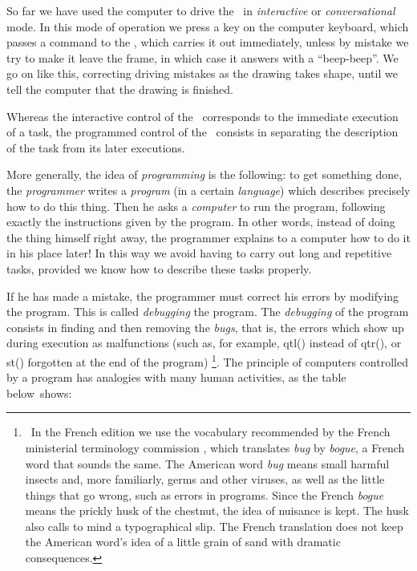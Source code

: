 
So far we have used the computer to
drive the \robot\ in {\em interactive} or
{\em conversational} mode. In this mode of operation
we press a key on the computer keyboard, which passes
a command to the \robot, which carries it out immediately, unless by mistake
we try to make it leave the frame, in which case it answers with
a ``beep-beep''.
We go on like this, correcting driving mistakes as
the drawing takes shape, until we
tell the computer that the drawing is finished.

\smallskip

Whereas the interactive control of the \robot\ corresponds to the immediate
execution of a task, the programmed control of the \robot\ consists
in separating the description of the task from its later executions.

\smallskip

More
generally, the idea of {\em programming} is the following:
to get something done, the {\em programmer} writes a {\em program}
(in a certain {\em language}) which describes precisely how
to do this thing. Then he asks a {\em computer} to run
the program, following exactly the instructions given by the
program. In other words, instead of doing the thing
himself right away, the programmer explains to a computer how
to do it in his place later! In this way we avoid having to carry out
long and repetitive tasks, provided we know how to
describe these tasks properly.

\smallskip

If he has made a mistake, the programmer
must correct his errors by modifying the program. This is called
{\em debugging} the program. The {\em debugging}
of the program consists in finding and then removing the {\em bugs}, that is, the
errors which show up during execution as malfunctions (such as, for
example, {\idt qtl()} instead of {\idt qtr()}, or {\idt st()} forgotten at the end of the program)%
\footnote{\ In the French edition we use the vocabulary recommended by the French ministerial
terminology commission \cite{terminologie-info}, which translates {\em bug} by {\em bogue},
a French word that sounds the same. The American word {\em bug}
means small harmful insects and, more familiarly, germs
and other viruses, as well as the little things that go wrong, such as errors
in programs. Since the French {\em bogue} means the prickly husk
of the chestnut, the idea of nuisance is kept. The husk also
calls to mind a typographical slip. The French translation
does not keep the American word's idea of a little grain of sand with dramatic
consequences.}.
The principle of computers controlled by a program has
analogies with many human activities,
as the table \hbox{below shows:}

